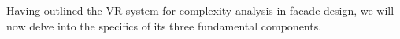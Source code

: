 Having outlined the VR system for complexity analysis in facade design, we will now delve into the specifics of its three fundamental components.


%
%
%
%
%
%
%
%
%
